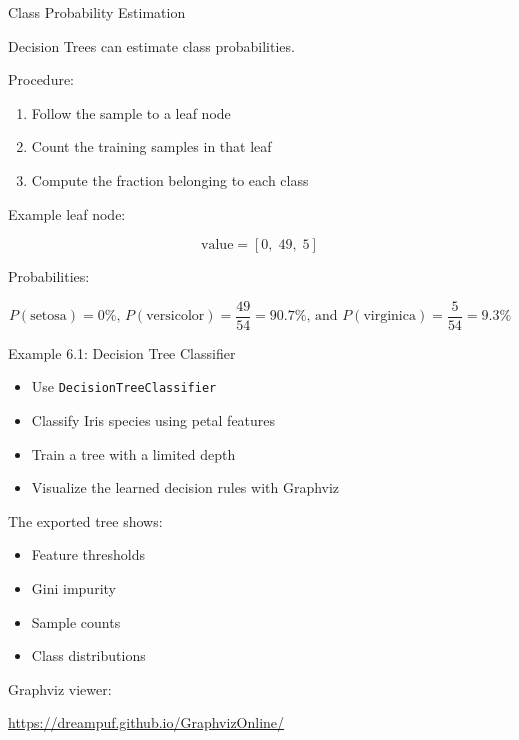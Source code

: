 \documentclass[aspectratio=169]{beamer}
\begin{document}

\begin{frame}{Class Probability Estimation}
	
	Decision Trees can estimate class probabilities.
	
	\vspace{0.5em}
	
	Procedure:
	
	\begin{enumerate}
		\item Follow the sample to a leaf node
		\item Count the training samples in that leaf
		\item Compute the fraction belonging to each class
	\end{enumerate}
	
	\vspace{0.75em}
	
	Example leaf node:
	
	\[
	\text{value} = [0,\;49,\;5]
	\]
	
	\vspace{0.5em}
	
	Probabilities:
	
	\[
	P(\text{setosa}) = 0\% \text{,  } P(\text{versicolor}) = \frac{49}{54}=90.7\%  \text{, and } P(\text{virginica}) = \frac{5}{54}=9.3\%
	\]
	
\end{frame}


\begin{frame}{Example 6.1: Decision Tree Classifier}
	
	\begin{itemize}
		\item Use \texttt{DecisionTreeClassifier}
		\item Classify Iris species using petal features
		\item Train a tree with a limited depth
		\item Visualize the learned decision rules with Graphviz
	\end{itemize}
	
	\vspace{0.5em}
	
	The exported tree shows:
	
	\begin{itemize}
		\item Feature thresholds
		\item Gini impurity
		\item Sample counts
		\item Class distributions
	\end{itemize}
	
	\vspace{0.5em}
	
	Graphviz viewer:
	
	\vspace{0.3em}
	
	\url{https://dreampuf.github.io/GraphvizOnline/}
	
\end{frame}
\end{document}
